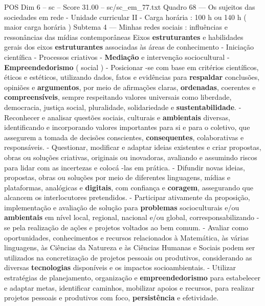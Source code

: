 \begin{textsample}{POS Dim 6 – sc – Score 31.00 – sc/sc\_em\_77.txt}
Quadro 68 — Os sujeitos das sociedades em rede - Unidade curricular II - Carga horária : 100 h ou 140 h ( maior carga horária ) Subtema 4 — Minhas redes sociais : influências e ressonâncias das mídias contemporâneas Eixos \textbf{estruturantes} e habilidades gerais dos eixos \textbf{estruturantes} associadas às áreas de conhecimento - Iniciação científica - Processos criativos - \textbf{Mediação} e intervenção sociocultural - \textbf{Empreendedorismo} ( social ) - Posicionar -se com base em critérios científicos, éticos e estéticos, utilizando dados, fatos e evidências para \textbf{respaldar} conclusões, opiniões e \textbf{argumentos}, por meio de afirmações claras, \textbf{ordenadas}, coerentes e \textbf{compreensíveis}, sempre respeitando valores universais como liberdade, democracia, justiça social, pluralidade, solidariedade e \textbf{sustentabilidade}. - Reconhecer e analisar questões sociais, culturais e \textbf{ambientais} diversas, identificando e incorporando valores importantes para si e para o coletivo, que assegurem a tomada de decisões conscientes, \textbf{consequentes}, colaborativas e responsáveis. - Questionar, modificar e adaptar ideias existentes e criar propostas, obras ou soluções criativas, originais ou inovadoras, avaliando e assumindo riscos para lidar com as incertezas e colocá -las em prática. - Difundir novas ideias, propostas, obras ou soluções por meio de diferentes linguagens, mídias e plataformas, analógicas e \textbf{digitais}, com confiança e \textbf{coragem}, assegurando que alcancem os interlocutores pretendidos. - Participar ativamente da proposição, implementação e avaliação de solução para \textbf{problemas} socioculturais e/ou \textbf{ambientais} em nível local, regional, nacional e/ou global, corresponsabilizando -se pela realização de ações e projetos voltados ao bem comum. - Avaliar como oportunidades, conhecimentos e recursos relacionados à Matemática, às várias linguagens, às Ciências da Natureza e às Ciências Humanas e Sociais podem ser utilizados na concretização de projetos pessoais ou produtivos, considerando as diversas \textbf{tecnologias} disponíveis e os impactos socioambientais. - Utilizar estratégias de planejamento, organização e \textbf{empreendedorismo} para estabelecer e adaptar metas, identificar caminhos, mobilizar apoios e recursos, para realizar projetos pessoais e produtivos com foco, \textbf{persistência} e efetividade.

\end{textsample}

